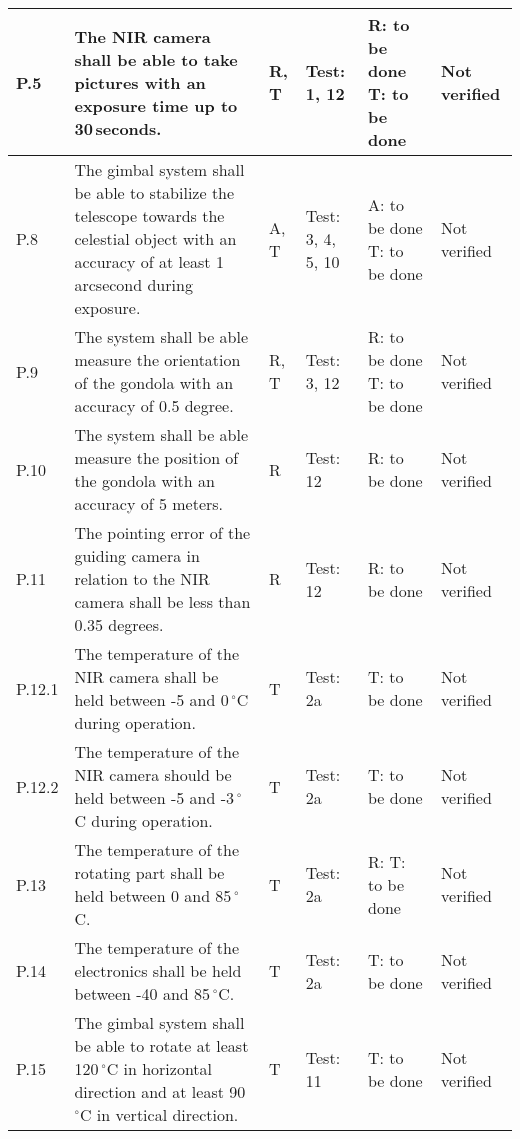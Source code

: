 \begin{longtable}[]{|m{}| m{}|m{}|m{}|m{}|m{}|}
P.5 & The NIR camera shall be able to take pictures with an exposure time up to 30\,seconds.
& R, T & Test: 1, 12 & R: to be done \newline T: to be done & Not verified \\\hline

  P.8 & The gimbal system shall be able to stabilize the telescope towards the celestial object with an accuracy of at least 1 arcsecond during exposure.
& A, T & Test: 3, 4, 5, 10 & A: to be done \newline T: to be done & Not verified \\\hline

  P.9 & The system shall be able measure the orientation of the gondola with an accuracy of 0.5 degree.
& R, T & Test: 3, 12 & R: to be done \newline T: to be done  & Not verified \\\hline

  P.10 & The system shall be able measure the position of the gondola with an accuracy of 5 meters.
& R & Test: 12 & R: to be done & Not verified \\\hline

  P.11 & The pointing error of the guiding camera in relation to the NIR camera shall be less than 0.35 degrees.
& R & Test: 12 & R: to be done & Not verified \\\hline

  P.12.1 & The temperature of the NIR camera shall be held between -5 and 0\,$^\circ$C during operation.
& T & Test: 2a & T: to be done & Not verified \\\hline

  P.12.2 & The temperature of the NIR camera should be held between -5 and -3\,$^\circ$C during operation.
& T & Test: 2a &  T: to be done & Not verified \\\hline

  P.13 & The temperature of the rotating part shall be held between 0 and 85\,$^\circ$C.
& T & Test: 2a & R: T: to be done & Not verified \\\hline

  P.14 & The temperature of the electronics shall be held between -40 and 85\,$^\circ$C.
& T & Test: 2a & T: to be done & Not verified \\\hline

P.15 & The gimbal system shall be able to rotate at least 120\,$^\circ$C in horizontal direction and at least 90\,$^\circ$C in vertical direction.
& T & Test: 11 & T: to be done & Not verified \\\hline




\end{longtable}
